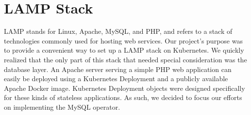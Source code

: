 \section{LAMP Stack}
LAMP stands for Linux, Apache, MySQL, and PHP, and refers to a stack of technologies commonly used
for hosting web services. Our project’s purpose was to provide a convenient way to set up a LAMP
stack on Kubernetes. We quickly realized that the only part of this stack that needed special
consideration was the database layer. An Apache server serving a simple PHP web application can
easily be deployed using a Kubernetes Deployment and a publicly available Apache Docker image.
Kubernetes Deployment objects were designed specifically for these kinds of stateless applications.
As such, we decided to focus our efforts on implementing the MySQL operator.